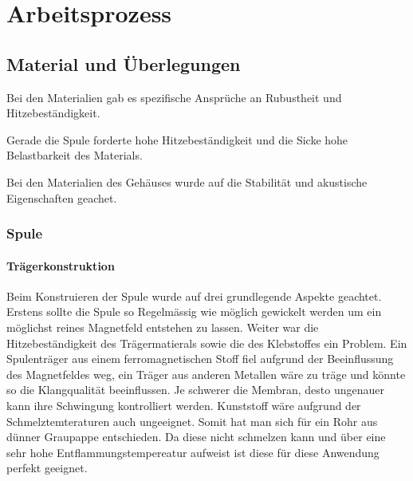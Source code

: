 \documentclass[a4paper,11pt]{report}
\begin{document}
\chapter{Arbeitsprozess}
\section{Material und Überlegungen}
Bei den Materialien gab es spezifische Ansprüche an Rubustheit und Hitzebeständigkeit.

Gerade die Spule forderte hohe Hitzebeständigkeit und die Sicke hohe Belastbarkeit des Materials.

Bei den Materialien des Gehäuses wurde auf die Stabilität und akustische Eigenschaften geachet.

\subsection{Spule}
\subsubsection*{Trägerkonstruktion}

Beim Konstruieren der Spule wurde auf drei grundlegende Aspekte geachtet. Erstens sollte die Spule so Regelmässig wie möglich gewickelt werden um ein möglichst reines Magnetfeld entstehen zu lassen. Weiter war die Hitzebeständigkeit des Trägermatierals sowie die des Klebstoffes ein Problem. Ein Spulenträger aus einem ferromagnetischen Stoff fiel aufgrund der Beeinflussung des Magnetfeldes weg, ein Träger aus anderen Metallen wäre zu träge und könnte so die Klangqualität beeinflussen. Je schwerer die Membran, desto ungenauer kann ihre Schwingung kontrolliert werden. Kunststoff wäre aufgrund der Schmelztemteraturen auch ungeeignet. Somit hat man sich für ein Rohr aus dünner Graupappe entschieden. Da diese nicht schmelzen kann und über eine sehr hohe Entflammungstempereatur aufweist ist diese für diese Anwendung perfekt geeignet. 

\newpage
\end{document}
